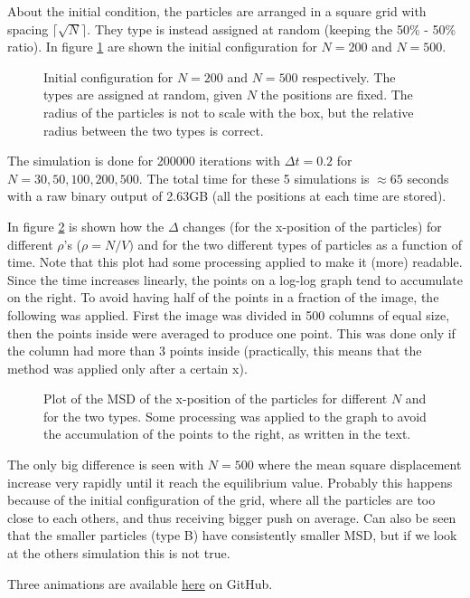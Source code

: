 \documentclass[../main.tex]{subfiles}
\begin{document}
About the initial condition, the particles are arranged in a square grid with spacing $\lceil\sqrt{N}\rceil$. They type is instead assigned at random (keeping the 50\% - 50\% ratio). In figure \ref{fig: ex_13_time0} are shown the initial configuration for $N=200$ and $N=500$.
\begin{figure}[!ht]
    \centering
    \begin{subfigure}{.49\textwidth}
        \centering
        
    \end{subfigure}
    \begin{subfigure}{.49\textwidth}
        \centering
        
    \end{subfigure}
    \caption{Initial configuration for $N=200$ and $N=500$ respectively. The types are assigned at random, given $N$ the positions are fixed. The radius of the particles is not to scale with the box, but the relative radius between the two types is correct.}
    \label{fig: ex_13_time0}
\end{figure}

The simulation is done for 200000 iterations with $\Delta t = 0.2$ for $N=30, 50, 100, 200, 500$. The total time for these 5 simulations is $\approx 65$ seconds with a raw binary output of 2.63GB (all the positions at each time are stored).

In figure \ref{fig: ex_13} is shown how the $\Delta$ changes (for the x-position of the particles) for different $\rho$'s ($\rho = N/V)$ and for the two different types of particles as a function of time. Note that this plot had some processing applied to make it (more) readable. Since the time increases linearly, the points on a log-log graph tend to accumulate on the right. To avoid having half of the points in a fraction of the image, the following was applied. First the image was divided in 500 columns of equal size, then the points inside were averaged to produce one point. This was done only if the column had more than 3 points inside (practically, this means that the method was applied only after a certain x).

\begin{figure}[ht!]
    \centerline{}
    \caption{Plot of the MSD of the x-position of the particles for different $N$ and for the two types. Some processing was applied to the graph to avoid the accumulation of the points to the right, as written in the text.}
    \label{fig: ex_13}
\end{figure}

The only big difference is seen with $N=500$ where the mean square displacement increase very rapidly until it reach the equilibrium value. Probably this happens because of the initial configuration of the grid, where all the particles are too close to each others, and thus receiving bigger push on average. Can also be seen that the smaller particles (type B) have consistently smaller MSD, but if we look at the others simulation this is not true. 

Three animations are available \href{https://github.com/EmanueleSarte/nmsm/blob/main/ex13/README.md}{here}  on GitHub.
\end{document}
